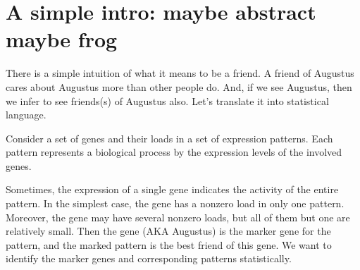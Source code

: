 \documentclass{llncs}
\begin{document}
\begin{abstract}

\textcolor{green}{We define a tag's most friendly cloud as a cloud that pays maximal rank-normalized attention to the tag.}
\textcolor{blue}{ -- we will return here --} \textcolor{purple}{
Suppose we have a set of {\tag}s and a set of fuzzy set of {\tag}s, which we will refer to as {\cloud}s, and we have the {\tag}-to-{\cloud} relation quantified as a scalar for each $\left( {\tag},{\cloud}\right)$ pair. An example is: {\tag}s are genes, {\cloud}s are gene expression patterns, and the scalars are loads of the genes in the patterns. Sometimes, an observation that a gene is expressed implies the expression of a particular pattern (the simplest case is: the gene has nonzero load only in that pattern). If so, we say that the gene marks the pattern. Here we describe a statistical test that identifies pairs of a marker {\tag} and the marked {\cloud}. The test is based on rank statistics and it does not rely on propositions about the distribution of the relation quantity. The marked {\cloud} is referred to as the {\tag}'s best friend, and the test is named "the best friends test" or "the gene's best friends test". The statistics naturally expand to the case when a {\tag} selects (separates) a subset of {\cloud}s, thus having more than one best friend. The code (currently, only R) is available at \url{https://github.com/favorov/best-friends}
}
\end{abstract}
%
\section{A simple intro: maybe abstract maybe frog}

There is a simple intuition of what it means to be a friend. A friend of Augustus cares about Augustus more than other people do. And, if we see Augustus, then we infer to see friends(s) of Augustus also. \textcolor{navyblue}{Let’s translate it into statistical language.}

Consider a set of genes and their loads in a set of expression patterns. Each pattern represents a biological process by the expression levels of the involved genes. 

Sometimes, the expression of a single gene indicates the activity of the entire pattern. In the simplest case, the gene has a nonzero load in only one pattern. 
Moreover, the gene may have several nonzero loads, but all of them but one are relatively small. Then the gene (AKA Augustus) is the marker gene for the pattern, and the marked pattern is the best friend of this gene. We want to identify the marker genes and corresponding patterns statistically.  
\end{document}
